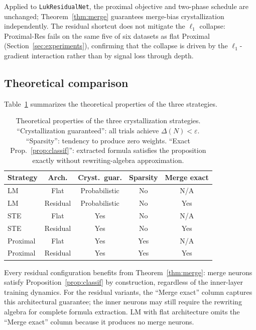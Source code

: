 \documentclass[lettersize,journal]{IEEEtran}
\begin{document}
Applied to \texttt{LukResidualNet}, the proximal objective and two-phase
schedule are unchanged; Theorem~\ref{thm:merge} guarantees merge-bias
crystallization independently.
The residual shortcut does not mitigate the $\ell_1$ collapse:
Proximal-Res fails on the same five of six datasets as flat Proximal
(Section~\ref{sec:experiments}), confirming that the collapse is driven by
the $\ell_1$-gradient interaction rather than by signal loss through depth.

\subsection{Theoretical comparison}
\label{ssec:comparison}

Table~\ref{tab:theory} summarizes the theoretical properties of the three strategies.

\begin{table}[h]
\centering
\caption{Theoretical properties of the three crystallization strategies.
``Crystallization guaranteed'': all trials achieve $\Delta(N) < \varepsilon$.
``Sparsity'': tendency to produce zero weights.
``Exact Prop.~\ref{prop:classif}'': extracted formula satisfies the proposition
exactly without rewriting-algebra approximation.}
\label{tab:theory}
\setlength{\tabcolsep}{5pt}
\begin{tabular}{lcccc}
\toprule
Strategy & Arch. & Cryst.\ guar. & Sparsity & Merge exact \\
\midrule
LM    & Flat     & Probabilistic & No  & N/A \\
LM    & Residual & Probabilistic & No  & Yes  \\
STE              & Flat     & Yes           & No  & N/A \\
STE              & Residual & Yes           & No  & Yes \\
Proximal         & Flat     & Yes           & Yes & N/A \\
Proximal         & Residual & Yes           & Yes & Yes \\
\bottomrule
\end{tabular}
\end{table}

Every residual configuration benefits from Theorem~\ref{thm:merge}:
merge neurons satisfy Proposition~\ref{prop:classif} by construction,
regardless of the inner-layer training dynamics.
For the residual variants, the ``Merge exact'' column captures this
architectural guarantee; the inner neurons may still require the rewriting
algebra for complete formula extraction.
LM with flat architecture omits the ``Merge exact'' column because it
produces no merge neurons.
\end{document}
